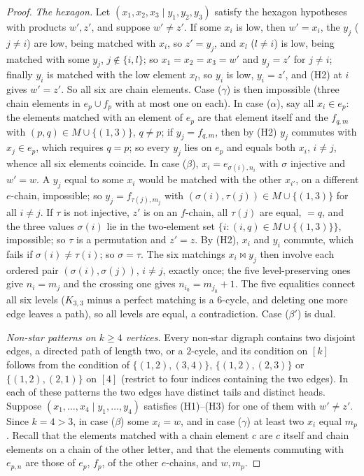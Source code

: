 \documentclass[11pt]{amsart}
\theoremstyle{definition}
\newcommand{\mt}{\bowtie}   %
\begin{document}
\begin{proof}
\emph{The hexagon.} Let $(x_1,x_2,x_3\mid y_1,y_2,y_3)$ satisfy the hexagon hypotheses with products $w',z'$, and suppose $w'\ne z'$. If some $x_i$ is low, then $w'=x_i$, the $y_j$ ($j\ne i$) are low, being matched with $x_i$, so $z'=y_j$, and $x_l$ ($l\ne i$) is low, being matched with some $y_j$, $j\notin\{i,l\}$; so $x_1=x_2=x_3=w'$ and $y_j=z'$ for $j\ne i$; finally $y_i$ is matched with the low element $x_l$, so $y_i$ is low, $y_i=z'$, and (H2) at $i$ gives $w'=z'$. So all six are chain elements. Case ($\gamma$) is then impossible (three chain elements in $e_p\cup f_p$ with at most one on each). In case ($\alpha$), say all $x_i\in e_p$: the elements matched with an element of $e_p$ are that element itself and the $f_{q,m}$ with $(p,q)\in M\cup\{(1,3)\}$, $q\ne p$; if $y_j=f_{q,m}$, then by (H2) $y_j$ commutes with $x_j\in e_p$, which requires $q=p$; so every $y_j$ lies on $e_p$ and equals both $x_i$, $i\ne j$, whence all six elements coincide. In case ($\beta$), $x_i=e_{\sigma(i),n_i}$ with $\sigma$ injective and $w'=w$. A $y_j$ equal to some $x_i$ would be matched with the other $x_{i'}$, on a different $e$-chain, impossible; so $y_j=f_{\tau(j),m_j}$ with $(\sigma(i),\tau(j))\in M\cup\{(1,3)\}$ for all $i\ne j$. If $\tau$ is not injective, $z'$ is on an $f$-chain, all $\tau(j)$ are equal, $=q$, and the three values $\sigma(i)$ lie in the two-element set $\{i:(i,q)\in M\cup\{(1,3)\}\}$, impossible; so $\tau$ is a permutation and $z'=z$. By (H2), $x_i$ and $y_i$ commute, which fails if $\sigma(i)\ne\tau(i)$; so $\sigma=\tau$. The six matchings $x_i\mt y_j$ then involve each ordered pair $(\sigma(i),\sigma(j))$, $i\ne j$, exactly once; the five level-preserving ones give $n_i=m_j$ and the crossing one gives $n_{i_0}=m_{j_0}+1$. The five equalities connect all six levels ($K_{3,3}$ minus a perfect matching is a $6$-cycle, and deleting one more edge leaves a path), so all levels are equal, a contradiction. Case ($\beta'$) is dual.

\emph{Non-star patterns on $k\ge4$ vertices.} Every non-star digraph contains two disjoint edges, a directed path of length two, or a $2$-cycle, and its condition on $[k]$ follows from the condition of $\{(1,2),(3,4)\}$, $\{(1,2),(2,3)\}$ or $\{(1,2),(2,1)\}$ on $[4]$ (restrict to four indices containing the two edges). In each of these patterns the two edges have distinct tails and distinct heads. Suppose $(x_1,\dots,x_4\mid y_1,\dots,y_4)$ satisfies (H1)--(H3) for one of them with $w'\ne z'$. Since $k=4>3$, in case ($\beta$) some $x_i=w$, and in case ($\gamma$) at least two $x_i$ equal $m_p$. Recall that the elements matched with a chain element $c$ are $c$ itself and chain elements on a chain of the other letter, and that the elements commuting with $e_{p,n}$ are those of $e_p$, $f_p$, of the other $e$-chains, and $w,m_p$.


\end{proof}
\end{document}

